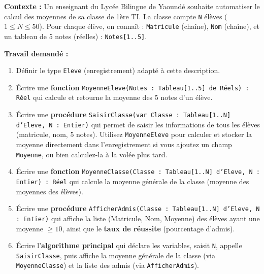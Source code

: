 \documentclass[11pt]{article}
\begin{document}
\begin{exercice}
\textbf{Contexte :} Un enseignant du Lycée Bilingue de Yaoundé souhaite automatiser le calcul des moyennes de sa classe de 1ère TI. La classe compte \texttt{N} élèves ($1 \le N \le 50$). Pour chaque élève, on connaît : \texttt{Matricule} (chaîne), \texttt{Nom} (chaîne), et un tableau de 5 notes (réelles) : \texttt{Notes[1..5]}.

\textbf{Travail demandé :}
\begin{enumerate}
    \item Définir le type \texttt{Eleve} (enregistrement) adapté à cette description.
    \item Écrire une \textbf{fonction} \texttt{MoyenneEleve(Notes : Tableau[1..5] de Réels) : Réel} qui calcule et retourne la moyenne des 5 notes d'un élève.
    \item Écrire une \textbf{procédure} \texttt{SaisirClasse(var Classe : Tableau[1..N] d'Eleve, N : Entier)} qui permet de saisir les informations de tous les élèves (matricule, nom, 5 notes). Utilisez \texttt{MoyenneEleve} pour calculer et stocker la moyenne directement dans l'enregistrement si vous ajoutez un champ \texttt{Moyenne}, ou bien calculez-la à la volée plus tard.
    \item Écrire une \textbf{fonction} \texttt{MoyenneClasse(Classe : Tableau[1..N] d'Eleve, N : Entier) : Réel} qui calcule la moyenne générale de la classe (moyenne des moyennes des élèves).
    \item Écrire une \textbf{procédure} \texttt{AfficherAdmis(Classe : Tableau[1..N] d'Eleve, N : Entier)} qui affiche la liste (Matricule, Nom, Moyenne) des élèves ayant une moyenne $\ge 10$, ainsi que le \textbf{taux de réussite} (pourcentage d'admis).
    \item Écrire l'\textbf{algorithme principal} qui déclare les variables, saisit \texttt{N}, appelle \texttt{SaisirClasse}, puis affiche la moyenne générale de la classe (via \texttt{MoyenneClasse}) et la liste des admis (via \texttt{AfficherAdmis}).
\end{enumerate}
\end{exercice}
\end{document}

